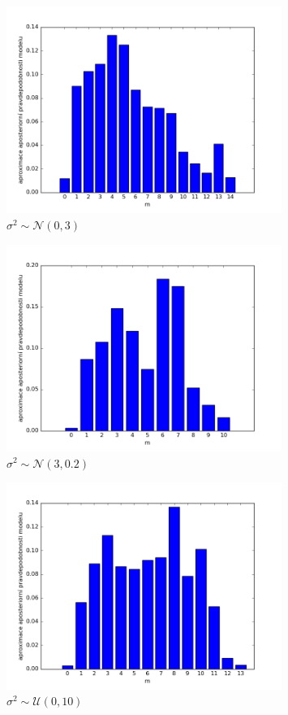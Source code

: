 \documentclass[czech,master,public,dept470,male,cpdeclaration,oneside, python]{diploma}
\begin{document}
\begin{figure}
	[H]\centering\includegraphics[width=0.8\textwidth]{images/priklad4_N03_hist.png}\caption{$\sigma^2 \sim \mathcal{N}(0, 3)$}\label{sigmaN03}
\end{figure}

\begin{figure}
	[H]\centering\includegraphics[width=0.8\textwidth]{images/priklad4_N302_hist.png}\caption{$\sigma^2 \sim \mathcal{N}(3, 0.2)$}\label{sigmaN30}
\end{figure}

\begin{figure}
	[H]\centering\includegraphics[width=0.8\textwidth]{images/priklad4_U010_hist.png}\caption{$\sigma^2 \sim \mathcal{U}(0, 10)$}\label{sigmaU010}
\end{figure}
\end{document}
